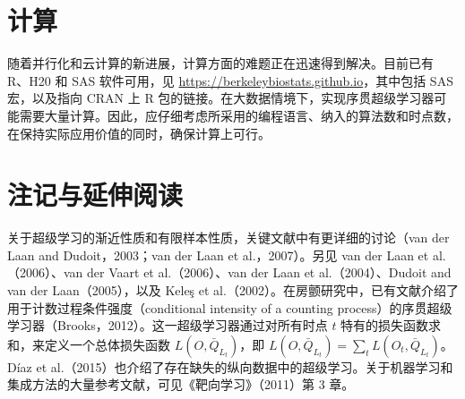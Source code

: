 \section{计算}
\label{sec:ch03-computation}

随着并行化和云计算的新进展，计算方面的难题正在迅速得到解决。目前已有 R、H20 和 SAS 软件可用，见 \url{https://berkeleybiostats.github.io}，其中包括 SAS 宏，以及指向 CRAN 上 R 包的链接。在大数据情境下，实现序贯超级学习器可能需要大量计算。因此，应仔细考虑所采用的编程语言、纳入的算法数和时点数，在保持实际应用价值的同时，确保计算上可行。

\section{注记与延伸阅读}
\label{sec:ch03-notes}

关于超级学习的渐近性质和有限样本性质，关键文献中有更详细的讨论（van der Laan and Dudoit，2003；van der Laan et al.，2007）。另见 van der Laan et al.（2006）、van der Vaart et al.（2006）、van der Laan et al.（2004）、Dudoit and van der Laan（2005），以及 Keleş et al.（2002）。在房颤研究中，已有文献介绍了用于计数过程条件强度（conditional intensity of a counting process）的序贯超级学习器（Brooks，2012）。这一超级学习器通过对所有时点 $t$ 特有的损失函数求和，来定义一个总体损失函数 $L(O,\bar Q_{L_t})$，即 $L(O,\bar Q_{L_t})=\sum_t L(O_t,\bar Q_{L_t})$。Díaz et al.（2015）也介绍了存在缺失的纵向数据中的超级学习。关于机器学习和集成方法的大量参考文献，可见《靶向学习》（2011）第 3 章。
